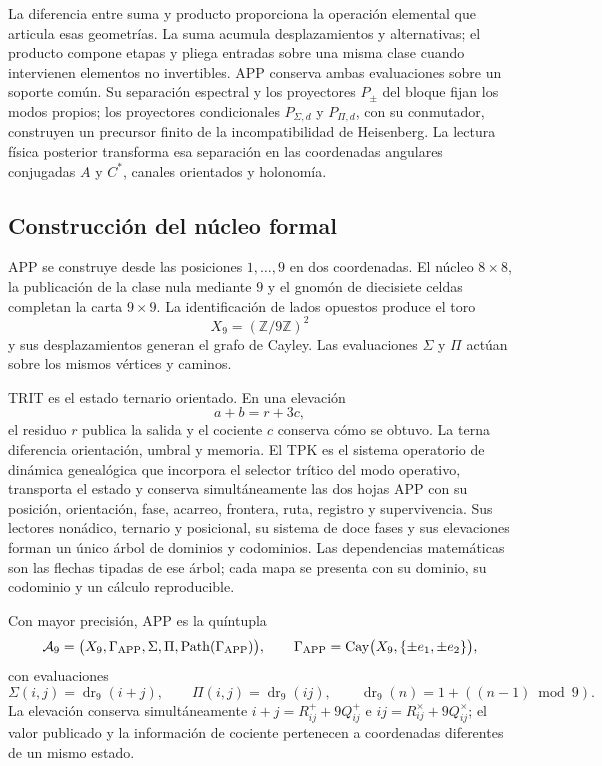 La diferencia entre suma y producto proporciona la operación elemental que
articula esas geometrías. La suma acumula desplazamientos y alternativas; el
producto compone etapas y pliega entradas sobre una misma clase cuando
intervienen elementos no invertibles. APP conserva ambas evaluaciones sobre
un soporte común. Su separación espectral y los proyectores \(P_\pm\) del
bloque fijan los modos propios; los proyectores condicionales
\(P_{\Sigma,d}\) y \(P_{\Pi,d}\), con su conmutador, construyen un precursor
finito de la incompatibilidad de Heisenberg. La
lectura física posterior transforma esa separación en las coordenadas
angulares conjugadas \(A\) y \(C^*\),
canales orientados y holonomía.

\subsection*{Construcción del núcleo formal}

APP se construye desde las posiciones \(1,\ldots,9\) en dos coordenadas. El
núcleo \(8\times8\), la publicación de
la clase nula mediante \(9\) y el gnomón de diecisiete celdas completan la
carta \(9\times9\). La identificación de lados opuestos produce el toro
\[
 X_9=(\mathbb Z/9\mathbb Z)^2
\]
y sus desplazamientos generan el grafo de Cayley. Las evaluaciones
\(\Sigma\) y \(\Pi\) actúan sobre los mismos vértices y caminos.

TRIT es el estado ternario orientado. En una elevación
\[
 a+b=r+3c,
\]
el residuo \(r\) publica la salida y el cociente \(c\) conserva cómo se
obtuvo. La terna diferencia orientación, umbral y memoria. El TPK es el
sistema operatorio de dinámica genealógica que incorpora el selector trítico
del modo operativo, transporta el estado y conserva simultáneamente las dos
hojas APP con su posición, orientación, fase, acarreo, frontera, ruta,
registro y supervivencia. Sus lectores
nonádico, ternario y posicional, su sistema de doce fases y sus elevaciones
forman un único árbol de dominios y codominios. Las dependencias matemáticas
son las flechas tipadas de ese árbol; cada mapa se presenta con su dominio, su
codominio y un cálculo reproducible.

Con mayor precisión, APP es la quíntupla
\[
 \mathcal A_9=
 \bigl(X_9,\Gamma_{\rm APP},\Sigma,\Pi,
       \operatorname{Path}(\Gamma_{\rm APP})\bigr),
 \qquad
 \Gamma_{\rm APP}=\operatorname{Cay}
 \bigl(X_9,\{\pm e_1,\pm e_2\}\bigr),
\]
con evaluaciones
\[
 \Sigma(i,j)=\operatorname{dr}_9(i+j),\qquad
 \Pi(i,j)=\operatorname{dr}_9(ij),
 \qquad
 \operatorname{dr}_9(n)=1+((n-1)\bmod9).
\]
La elevación conserva simultáneamente
\(i+j=R^+_{ij}+9Q^+_{ij}\) e
\(ij=R^\times_{ij}+9Q^\times_{ij}\); el valor publicado y la información
de cociente pertenecen a coordenadas diferentes de un mismo estado.

